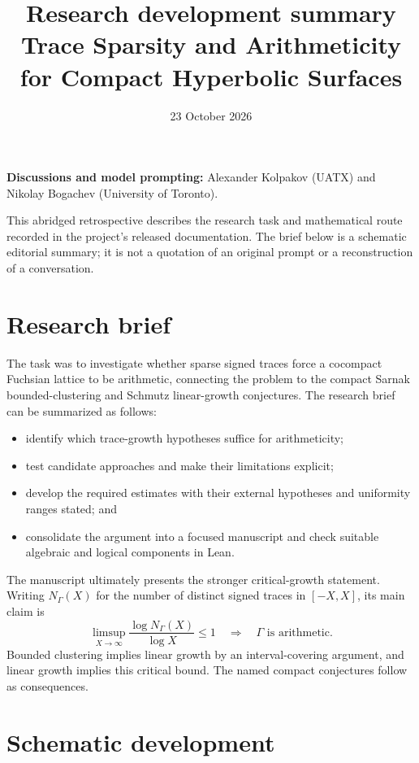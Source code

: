 \documentclass[11pt]{article}
\title{Research development summary\\
  \large Trace Sparsity and Arithmeticity for Compact Hyperbolic Surfaces}
\author{}
\date{23 October 2026}
\begin{document}
\maketitle

\noindent\textbf{Discussions and model prompting:}
Alexander Kolpakov (UATX) and Nikolay Bogachev (University of Toronto).

This abridged retrospective describes the research task and mathematical
route recorded in the project's released documentation. The brief below
is a schematic editorial summary; it is not a quotation of an original
prompt or a reconstruction of a conversation.

\section{Research brief}

The task was to investigate whether sparse signed traces force a cocompact
Fuchsian lattice to be arithmetic, connecting the problem to the compact
Sarnak bounded-clustering and Schmutz linear-growth conjectures. The
research brief can be summarized as follows:
\begin{itemize}
\item identify which trace-growth hypotheses suffice for arithmeticity;
\item test candidate approaches and make their limitations explicit;
\item develop the required estimates with their external hypotheses and
  uniformity ranges stated; and
\item consolidate the argument into a focused manuscript and check
  suitable algebraic and logical components in Lean.
\end{itemize}

The manuscript ultimately presents the stronger critical-growth statement.
Writing \(N_\Gamma(X)\) for the number of distinct signed traces in
\([-X,X]\), its main claim is
\[
 \limsup_{X\to\infty}\frac{\log N_\Gamma(X)}{\log X}\leq 1
 \quad\Longrightarrow\quad \Gamma\text{ is arithmetic}.
\]
Bounded clustering implies linear growth by an interval-covering argument,
and linear growth implies this critical bound. The named compact
conjectures follow as consequences.

\section{Schematic development}
\end{document}
